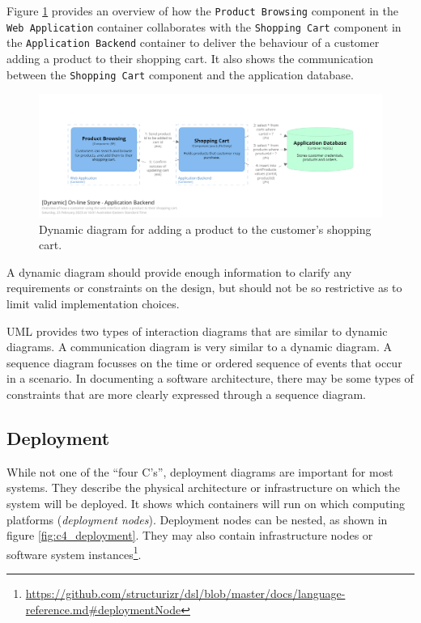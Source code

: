 Figure \ref{fig:c4_dynamic} provides an overview of how the
\texttt{Product Browsing} component in the \texttt{Web Application} container collaborates with the
\texttt{Shopping Cart} component in the \texttt{Application Backend} container
to deliver the behaviour of a customer adding a product to their shopping cart.
It also shows the communication between the \texttt{Shopping Cart} component and the application database.

\begin{figure}[h!]
    \centering
    \includegraphics[trim=175 220 197 185,clip,width=\textwidth]{images/c4/add_to_cart_dynamic_diagram.png}
    \caption{Dynamic diagram for adding a product to the customer's shopping cart.}
    \label{fig:c4_dynamic}
\end{figure}

\noindent
A dynamic diagram should provide enough information to clarify any requirements or constraints on the design,
but should not be so restrictive as to limit valid implementation choices.

UML provides two types of interaction diagrams that are similar to dynamic diagrams.
A communication diagram is very similar to a dynamic diagram.
A sequence diagram focusses on the time or ordered sequence of events that occur in a scenario.
In documenting a software architecture,
there may be some types of constraints that are more clearly expressed through a sequence diagram.

\subsection{Deployment}\label{sec:c4_deployment}
While not one of the ``four C's'', deployment diagrams are important for most systems.
They describe the physical architecture or infrastructure on which the system will be deployed.
It shows which containers will run on which computing platforms (\emph{deployment nodes}).
Deployment nodes can be nested, as shown in figure \ref{fig:c4_deployment}.
They may also contain infrastructure nodes or software system instances\footnote{\url{https://github.com/structurizr/dsl/blob/master/docs/language-reference.md\#deploymentNode}}.

